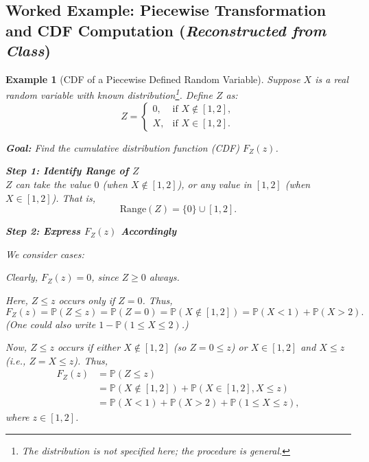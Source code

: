 \documentclass[12pt]{article}
\newtheorem{example}[definition]{Example}
\begin{document}
\subsection{Worked Example: Piecewise Transformation and CDF Computation (\textit{Reconstructed from Class})}
\label{ex:piecewise_cdf}

\begin{example}[CDF of a Piecewise Defined Random Variable]
    Suppose $X$ is a real random variable with known distribution\footnote{The distribution is not specified here; the procedure is general.}. Define $Z$ as:
    \[
    Z = \begin{cases}
        0, &\text{if } X \notin [1,2], \\
        X, &\text{if } X \in [1,2].
    \end{cases}
    \]
    
    \textbf{Goal:} Find the cumulative distribution function (CDF) $F_Z(z)$.

    \textbf{Step 1: Identify Range of $Z$}\\
    $Z$ can take the value $0$ (when $X \notin [1,2]$), or any value in $[1,2]$ (when $X \in [1,2]$). That is,
    \[
        \text{Range}(Z) = \{0\} \cup [1,2].
    \]
    
    \textbf{Step 2: Express $F_Z(z)$ Accordingly}

    We consider cases:

    \begin{description}[leftmargin=1.8em, style=sameline, labelsep=0.6em]
    \item[\underline{Case 1: $z < 0$}]
        Clearly, $F_Z(z) = 0$, since $Z \geq 0$ always.
    
    \item[\underline{Case 2: $0 \leq z < 1$}]
        Here, $Z \leq z$ occurs only if $Z = 0$. Thus,
        \[
           F_Z(z) = \mathbb{P}(Z \leq z) = \mathbb{P}(Z = 0) = \mathbb{P}(X \notin [1,2]) = \mathbb{P}(X < 1) + \mathbb{P}(X > 2).
        \]
        (One could also write $1 - \mathbb{P}(1 \leq X \leq 2)$.)

    \item[\underline{Case 3: $1 \leq z \leq 2$}]
        Now, $Z \leq z$ occurs if either $X \notin [1,2]$ (so $Z = 0 \leq z$) or $X \in [1,2]$ and $X \leq z$ (i.e., $Z = X \leq z$). Thus,
        \begin{align*}
            F_Z(z)
            &= \mathbb{P}(Z \leq z) \\
            &= \mathbb{P}(X \notin [1,2]) + \mathbb{P}(X \in [1,2], X \leq z) \\
            &= \mathbb{P}(X < 1) + \mathbb{P}(X > 2) + \mathbb{P}(1 \leq X \leq z),
        \end{align*}
        where $z \in [1,2]$.


\end{description}
\end{example}
\end{document}
